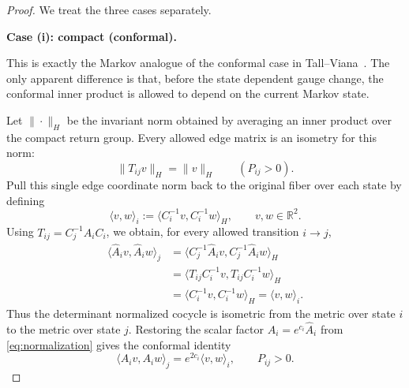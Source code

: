 \documentclass[11pt,a4paper]{amsart}
\theoremstyle{definition}
\theoremstyle{remark}
\numberwithin{equation}{section}
\newcommand{\RR}{\mathbb R}
\newcommand{\1}{\boldsymbol 1}
\begin{document}
\begin{proof}
We treat the three cases separately.

\medskip
\noindent
\textbf{Case (i): compact (conformal).}

This is exactly the Markov analogue of the conformal case in
Tall--Viana~\cite{TV}.  The only apparent difference is that, before the state dependent gauge change, the conformal inner product is allowed to depend on the current Markov state.

Let $\|\cdot\|_H$ be the invariant norm obtained by averaging an
inner product over the compact return group.  Every allowed edge
matrix is an isometry for this norm:
$$
 \|T_{ij}v\|_H=\|v\|_H
 \qquad(P_{ij}>0).
$$
Pull this single edge coordinate norm back to the original fiber over
each state by defining
\begin{equation}\label{eq:state-dependent-conformal-metric}
 \langle v,w\rangle_i
 :=\langle C_i^{-1}v,C_i^{-1}w\rangle_H,
 \qquad v,w\in\RR^2.
\end{equation}
Using $T_{ij}=C_j^{-1}\widehat A_iC_i$, we obtain, for every allowed
transition $i\to j$,
\begin{align*}
 \langle\widehat A_iv,\widehat A_iw\rangle_j
 &=\langle C_j^{-1}\widehat A_iv,
           C_j^{-1}\widehat A_iw\rangle_H\\
 &=\langle T_{ij}C_i^{-1}v,T_{ij}C_i^{-1}w\rangle_H\\
 &=\langle C_i^{-1}v,C_i^{-1}w\rangle_H
  =\langle v,w\rangle_i.
\end{align*}
Thus the determinant normalized cocycle is isometric from the metric
over state $i$ to the metric over state $j$.  Restoring the scalar
factor $A_i=e^{c_i}\widehat A_i$ from
\eqref{eq:normalization} gives the conformal identity
\begin{equation}\label{eq:markov-conformal-identity}
 \langle A_iv,A_iw\rangle_j
 =e^{2c_i}\langle v,w\rangle_i,
 \qquad P_{ij}>0.
\end{equation}


\end{proof}
\end{document}
